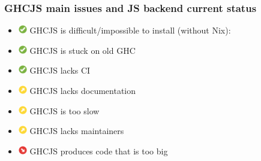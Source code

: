 \documentclass{beamer}
\begin{document}
\begin{frame}
\frametitle{GHCJS main issues and JS backend current status}
\begin{itemize}
\item[]
\includegraphics[height=1em]{images/check_green.png}
GHCJS is difficult/impossible to install (without Nix):

\item[]
\includegraphics[height=1em]{images/check_green.png}
GHCJS is stuck on old GHC

\item[]
\includegraphics[height=1em]{images/check_green.png}
GHCJS lacks CI

\item[]
\includegraphics[height=1em]{images/arrow-up-right-yellow.png}
GHCJS lacks documentation

\item[]
\includegraphics[height=1em]{images/arrow-up-right-yellow.png}
GHCJS is too slow

\item[]
\includegraphics[height=1em]{images/arrow-up-right-yellow.png}
GHCJS lacks maintainers

\item[]
\includegraphics[height=1em]{images/arrow-down-right-red.svg.png}
GHCJS produces code that is too big

\end{itemize}
\end{frame}
\end{document}
